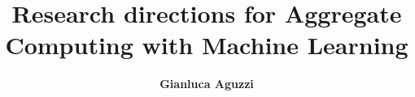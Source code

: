 \title{Research directions for Aggregate Computing with
Machine Learning}
\author[G. Aguzzi]{
  \textbf{Gianluca Aguzzi}
}
